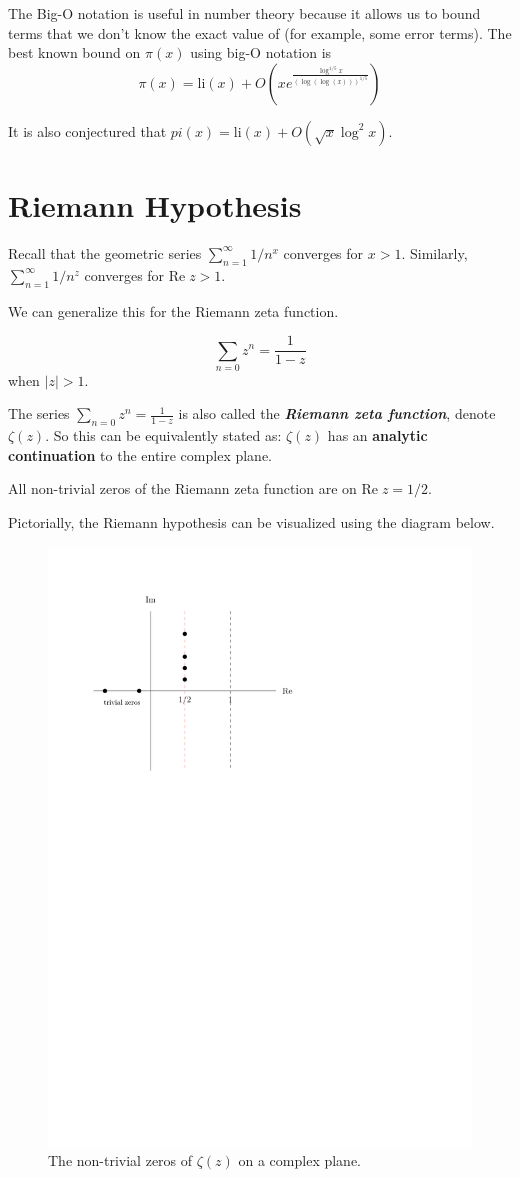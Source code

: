 The Big-O notation is useful in number theory because it allows us to bound terms that we don't know the exact value of (for example, some error terms). The best known bound on $\pi(x)$ using big-O notation is
$$
\pi(x) = \mathrm{li}(x) + O\left( xe^{\frac{\log^{1/5}x}{(\log(\log(x)))^{1/5}}} \right) 
$$

It is also conjectured that $pi(x) = \mathrm{li}(x) + O(\sqrt{x} \log^2 x)$.

\section{Riemann Hypothesis}
Recall that the geometric series $\sum_{n=1}^\infty 1/n^x$ converges for $x > 1$. Similarly, $\sum_{n=1}^\infty 1/n^z$ converges for $\mathrm{Re}\; z > 1$.

We can generalize this for the Riemann zeta function.

\begin{theorem}
    $$
    \sum_{n=0}z^n = \frac{1}{1-z}
    $$
    when $|z| > 1$.

    The series $\sum_{n=0}z^n = \frac{1}{1-z}$ is also called the \textit{\textbf{Riemann zeta function}}, denote $\zeta(z)$. So this can be equivalently stated as: $\zeta(z)$ has an \textbf{analytic continuation} to the entire complex plane.
\end{theorem}
\begin{conjecture}
    All non-trivial zeros of the Riemann zeta function are on $\mathrm{Re}\; z = 1/2$.
\end{conjecture}

Pictorially, the Riemann hypothesis can be visualized using the diagram below.

\begin{figure}[htbp]
    \centering
    \includegraphics[width=.5\linewidth]{figures/riemann-hypothesis.pdf} 
    \caption{The non-trivial zeros of $\zeta(z)$ on a complex plane.}
    \label{fig:riemann-hypothesis}
\end{figure}

